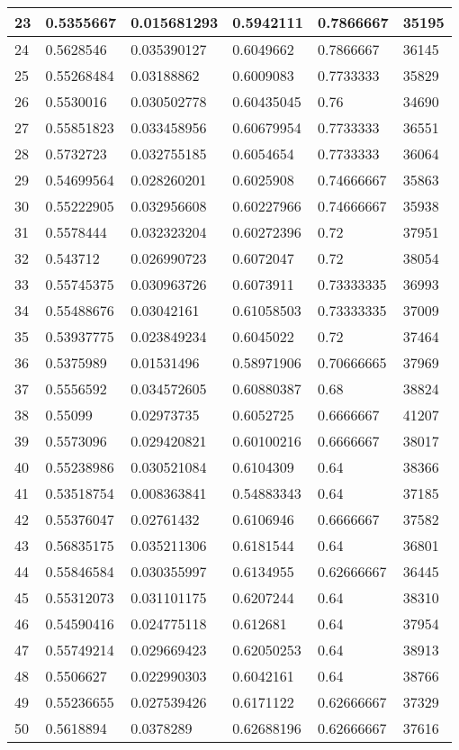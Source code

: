 \begin{longtable}{|l|l|l|l|l|l|}
23 & 0.5355667 & 0.015681293 & 0.5942111 & 0.7866667 & 35195 \\ \hline 
24 & 0.5628546 & 0.035390127 & 0.6049662 & 0.7866667 & 36145 \\ \hline 
25 & 0.55268484 & 0.03188862 & 0.6009083 & 0.7733333 & 35829 \\ \hline 
26 & 0.5530016 & 0.030502778 & 0.60435045 & 0.76 & 34690 \\ \hline 
27 & 0.55851823 & 0.033458956 & 0.60679954 & 0.7733333 & 36551 \\ \hline 
28 & 0.5732723 & 0.032755185 & 0.6054654 & 0.7733333 & 36064 \\ \hline 
29 & 0.54699564 & 0.028260201 & 0.6025908 & 0.74666667 & 35863 \\ \hline 
30 & 0.55222905 & 0.032956608 & 0.60227966 & 0.74666667 & 35938 \\ \hline 
31 & 0.5578444 & 0.032323204 & 0.60272396 & 0.72 & 37951 \\ \hline 
32 & 0.543712 & 0.026990723 & 0.6072047 & 0.72 & 38054 \\ \hline 
33 & 0.55745375 & 0.030963726 & 0.6073911 & 0.73333335 & 36993 \\ \hline 
34 & 0.55488676 & 0.03042161 & 0.61058503 & 0.73333335 & 37009 \\ \hline 
35 & 0.53937775 & 0.023849234 & 0.6045022 & 0.72 & 37464 \\ \hline 
36 & 0.5375989 & 0.01531496 & 0.58971906 & 0.70666665 & 37969 \\ \hline 
37 & 0.5556592 & 0.034572605 & 0.60880387 & 0.68 & 38824 \\ \hline 
38 & 0.55099 & 0.02973735 & 0.6052725 & 0.6666667 & 41207 \\ \hline 
39 & 0.5573096 & 0.029420821 & 0.60100216 & 0.6666667 & 38017 \\ \hline 
40 & 0.55238986 & 0.030521084 & 0.6104309 & 0.64 & 38366 \\ \hline 
41 & 0.53518754 & 0.008363841 & 0.54883343 & 0.64 & 37185 \\ \hline 
42 & 0.55376047 & 0.02761432 & 0.6106946 & 0.6666667 & 37582 \\ \hline 
43 & 0.56835175 & 0.035211306 & 0.6181544 & 0.64 & 36801 \\ \hline 
44 & 0.55846584 & 0.030355997 & 0.6134955 & 0.62666667 & 36445 \\ \hline 
45 & 0.55312073 & 0.031101175 & 0.6207244 & 0.64 & 38310 \\ \hline 
46 & 0.54590416 & 0.024775118 & 0.612681 & 0.64 & 37954 \\ \hline 
47 & 0.55749214 & 0.029669423 & 0.62050253 & 0.64 & 38913 \\ \hline 
48 & 0.5506627 & 0.022990303 & 0.6042161 & 0.64 & 38766 \\ \hline 
49 & 0.55236655 & 0.027539426 & 0.6171122 & 0.62666667 & 37329 \\ \hline 
50 & 0.5618894 & 0.0378289 & 0.62688196 & 0.62666667 & 37616 \\ \hline 
\end{longtable}